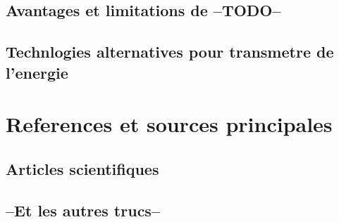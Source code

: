 \documentclass[11pt]{report}
\begin{document}
\section{Avantages et limitations de --TODO--}
\section{Technlogies alternatives pour transmetre de l'energie}

\chapter{References et sources principales}
\section{Articles scientifiques}
\section{--Et les autres trucs--}
\end{document}
